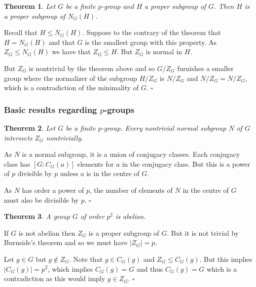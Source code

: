 \documentclass[10pt]{article}
\newtheorem{theorem}{Theorem}[section]
\newenvironment{proof}[1][Proof]{\begin{trivlist}
\item[\hskip \labelsep {\itshape #1}]}{\end{trivlist}}
\begin{document}
\begin{theorem}
Let $G$ be a finite $p$-group and $H$ a proper subgroup of $G$. Then $H$ is a proper subgroup of $N_G(H)$.
\end{theorem}

\begin{proof}
Recall that $H \leq N_G(H)$. Suppose to the contrary of the theorem that $H = N_G(H)$ and that $G$ is the smallest group with this property. As $Z_G \leq N_G(H)$ we have that $Z_G \leq H$. But $Z_G$ is normal in $H$.

But $Z_G$ is nontrivial by the theorem above and so $G/Z_G$ furnishes a smaller group where the normalizer of the subgroup $H/Z_G$ is $N/Z_G$ and $N/Z_G = N/Z_G$, which is a contradiction of the minimality of $G$. $\square$
\end{proof}

\subsubsection{Basic results regarding $p$-groups}

\begin{theorem}
Let $G$ be a finite $p$-group. Every nontrivial normal subgroup $N$ of $G$ intersects $Z_G$ nontrivially.
\end{theorem}

\begin{proof}
As $N$ is a normal subgroup, it is a union of conjugacy classes. Each conjugacy class has $[G:C_G(a)]$ elements for $a$ in the conjugacy class. But this is a power of $p$ divisible by $p$ unless $a$ is in the centre of $G$.

As $N$ has order a power of $p$, the number of elements of $N$ in the centre of $G$ must also be divisible by $p$. $\square$
\end{proof}

\begin{theorem}
A group $G$ of order $p^2$ is abelian.
\end{theorem}

\begin{proof}
If $G$ is not abelian then $Z_G$ is a proper subgroup of $G$. But it is not trivial by Burnside's theorem and so we must have $|Z_G| = p$.

Let $g \in G$ but $g \notin Z_G$. Note that $g \in C_G(g)$ and $Z_G \leq C_G(g)$. But this implies $|C_G(g)| = p^2$, which implies $C_G(g) = G$ and thus $C_G(g) = G$ which is a contradiction as this would imply $g \in Z_G$. $\square$
\end{proof}
\end{document}
